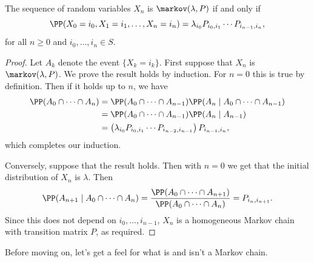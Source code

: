 \begin{theorem}
	The sequence of random variables $X_n$ is $\markov(\lambda, P)$ if and only if
	$$
	\PP(X_0 = i_0, X_1 = i_1, \dots, X_n = i_n) = \lambda_{i_0}P_{i_0, i_1} \cdots P_{i_{n - 1}, i_n},
	$$
	for all $n \geq 0$ and $i_0, \dots, i_n \in S$.
\end{theorem}
\begin{proof}
	Let $A_k$ denote the event $\{X_k = i_k\}$. First suppose that $X_n$ is $\markov(\lambda, P)$. We prove the result holds by induction. For $n = 0$ this is true by definition. Then if it holds up to $n$, we have
	\begin{align*}
	\PP(A_0 \cap \cdots \cap A_n)  &= \PP(A_0 \cap \cdots \cap A_{n - 1})\PP(A_n \mid A_0 \cap \cdots \cap A_{n - 1}) \\
	&= \PP(A_0 \cap \cdots \cap A_{n - 1})\PP(A_n \mid A_{n - 1}) \\ 
	&= \left(\lambda_{i_0}P_{i_0, i_1} \cdots P_{i_{n - 2}, i_{n - 1}}\right)P_{i_{n - 1}, i_n},
\end{align*}
which completes our induction.

Conversely, suppose that the result holds. Then with $n = 0$ we get that the initial distribution of $X_n$ is $\lambda$. Then
$$
\PP(A_{n + 1} \mid A_{0} \cap \cdots \cap A_n) = \frac{\PP(A_0 \cap \cdots \cap A_{n + 1})}{\PP(A_0 \cap \cdots \cap A_{n})} = P_{i_{n}, i_{n + 1}}.
$$
Since this does not depend on $i_0, \dots, i_{n - 1}$, $X_n$ is a homogeneous Markov chain with transition matrix $P$, as required.
\end{proof}

Before moving on, let's get a feel for what is and isn't a Markov chain.

